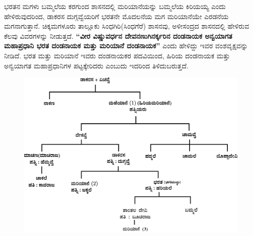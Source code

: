 ಭರತನ ಮಗಳು ಬಮ್ಮಲೆಯ ಕರಗುಂದ ಶಾಸನದಲ್ಲಿ ಮರಿಯಾನೆಯನ್ನು ಬಮ್ಮಲೆಯ ಕಿರಿಯಯ್ಯ ಎಂದು ಹೇಳಿರುವುದರಿಂದ, ಡಾಕರಸ ದುಗ್ಗವ್ವೆಯರಿಗೆ ಭರತನೇ ಮೊದಲನೆಯ ಮಗ ಮರಿಯಾನೆಯೇ ಎರಡನೆಯ ಮಗನಾಗುತ್ತಾನೆ. ಚಿಕ್ಕಮಗಳೂರು ತಾಲ್ಲೂಕು ಸಿಂಧಗಿರಿ(ಸಿಂಧಗೆರೆ) ಶಾಸನವು, ಅಳೀಸಂದ್ರದ ಶಾಸನದಲ್ಲಿ ಹೇಳಿರುವ ಕೆಲವು ವಿವರಗಳನ್ನು ನೀಡುತ್ತದೆ. \textbf{“ವೀರ ವಿಷ್ಣುವರ್ಧನ ದೇವನಣುಗಿನರ್ಕ್ಕರಿನ ದಂಡನಾಯಕ ಅನ್ವಯಾಗತ ಮಹಾಪ್ರಧಾನಿ ಭರತ ದಂಡನಾಯಕ ಮತ್ತು ಮರಿಯಾನೆ ದಂಡನಾಯಕ”} ಎಂದು ಹೇಳಿದ್ದು ಇವರ ವಂಶವೃಕ್ಷವನ್ನು ನೀಡಿದೆ. ಭರತ ಮತ್ತು ಮರಿಯಾನೆ ಇವರು ದಂಡನಾಯಕರ ಪದವಿಯಿಂದ, ಹಿರಿಯ ದಂಡನಾಯಕ ಮತ್ತು ಅನ್ವಯಾಗತ ಮಹಾಪ್ರಧಾನಿಗಳ ಪಟ್ಟಕ್ಕೇರಿದರು ಎಂಬುದು ಇದರಿಂದ ತಿಳಿದುಬರುತ್ತದೆ.

\begin{figure}[H]
\includegraphics[scale=1.15]{images/chap3/chap3fig13.jpeg}
\end{figure}

